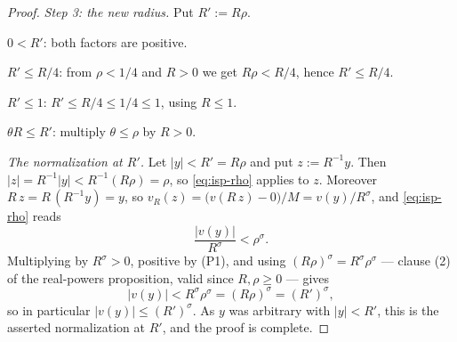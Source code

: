 \begin{proof}
\emph{Step 3: the new radius.}  Put $R':=R\rho$.

\emph{$0<R'$}: both factors are positive.

\emph{$R'\le R/4$}: from $\rho<1/4$ and $R>0$ we get $R\rho<R/4$, hence $R'\le R/4$.

\emph{$R'\le1$}: $R'\le R/4\le1/4\le1$, using $R\le1$.

\emph{$\theta R\le R'$}: multiply $\theta\le\rho$ by $R>0$.

\emph{The normalization at $R'$.}  Let $\lvert y\rvert<R'=R\rho$ and put $z:=R^{-1}y$.  Then
$\lvert z\rvert=R^{-1}\lvert y\rvert<R^{-1}(R\rho)=\rho$, so \eqref{eq:isp-rho} applies to $z$.
Moreover $R\,z=R\,(R^{-1}y)=y$, so
$v_R(z)=\bigl(v(R\,z)-0\bigr)/M=v(y)/R^{\sigma}$, and \eqref{eq:isp-rho} reads
\[
  \frac{\lvert v(y)\rvert}{R^{\sigma}}<\rho^{\sigma}.
\]
Multiplying by $R^{\sigma}>0$, positive by (P1), and using
$(R\rho)^{\sigma}=R^{\sigma}\rho^{\sigma}$ --- clause
(2) of the real-powers proposition, valid since $R,\rho\ge0$ --- gives
\[
  \lvert v(y)\rvert<R^{\sigma}\rho^{\sigma}=(R\rho)^{\sigma}=(R')^{\sigma},
\]
so in particular $\lvert v(y)\rvert\le (R')^{\sigma}$.  As $y$ was arbitrary with
$\lvert y\rvert<R'$, this is the asserted normalization at $R'$, and the proof is complete.
\end{proof}
